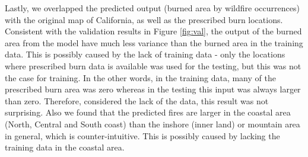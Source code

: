 \documentclass{article}
\begin{document}
Lastly, we overlapped the predicted output (burned area by wildfire occurrences) with the original map of California, as well as the prescribed burn locations. Consistent with the validation results in Figure \ref{fig:val}, the output of the burned area from the model have much less variance than the burned area in the training data. This is possibly caused by the lack of training data - only the locations where prescribed burn data is available was used for the testing, but this was not the case for training. In the other words, in the training data, many of the prescribed burn area was zero whereas in the testing this input was always larger than zero. Therefore, considered the lack of the data, this result was not surprising. Also we found that the predicted fires are larger in the coastal area (North, Central and South coast) than the inshore (inner land) or mountain area in general, which is counter-intuitive. This is possibly caused by lacking the training data in the coastal area. 
\end{document}
